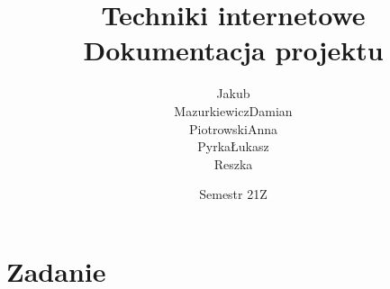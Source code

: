 \documentclass[12pt]{article}
\title{
    Techniki internetowe \\
    \large Dokumentacja projektu \quotes{Sieciowy system plików}
}
\author{
    \begin{tabular}{p{6em}p{6em}p{6em}p{6em}}
        \makecell{Jakub \\ Mazurkiewicz} &
        \makecell{Damian \\ Piotrowski} &
        \makecell{Anna \\ Pyrka} &
        \makecell{Łukasz \\ Reszka}
    \end{tabular}
}
\date{Semestr 21Z}
\begin{document}
\maketitle
\tableofcontents
\pagebreak

\section{Zadanie}
\end{document}
